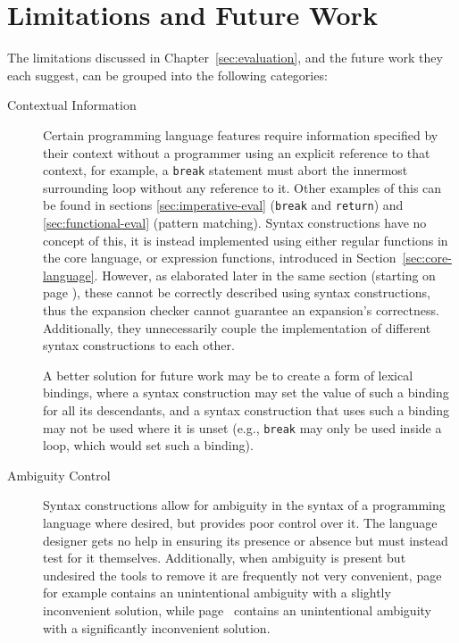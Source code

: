 \documentclass{kththesis}
\begin{document}
\section{Limitations and Future Work}

The limitations discussed in Chapter~\ref{sec:evaluation}, and the future work they each suggest, can be grouped into the following categories:

\begin{description}
  \item[Contextual Information] Certain programming language features require information specified by their context without a programmer using an explicit reference to that context, for example, a \texttt{break} statement must abort the innermost surrounding loop without any reference to it. Other examples of this can be found in sections \ref{sec:imperative-eval} (\texttt{break} and \texttt{return}) and \ref{sec:functional-eval} (pattern matching). Syntax constructions have no concept of this, it is instead implemented using either regular functions in the core language, or expression functions, introduced in Section~\ref{sec:core-language}. However, as elaborated later in the same section (starting on page \pageref{sec:efun-drawbacks}), these cannot be correctly described using syntax constructions, thus the expansion checker cannot guarantee an expansion's correctness. Additionally, they unnecessarily couple the implementation of different syntax constructions to each other.

  A better solution for future work may be to create a form of lexical bindings, where a syntax construction may set the value of such a binding for all its descendants, and a syntax construction that uses such a binding may not be used where it is unset (e.g., \texttt{break} may only be used inside a loop, which would set such a binding).

  \item[Ambiguity Control] Syntax constructions allow for ambiguity in the syntax of a programming language where desired, but provides poor control over it. The language designer gets no help in ensuring its presence or absence but must instead test for it themselves. Additionally, when ambiguity is present but undesired the tools to remove it are frequently not very convenient, page~\pageref{sec:lua-func-call-precedence} for example contains an unintentional ambiguity with a slightly inconvenient solution, while page~\pageref{sec:ambiguous-lists} contains an unintentional ambiguity with a significantly inconvenient solution.


\end{description}
\end{document}
